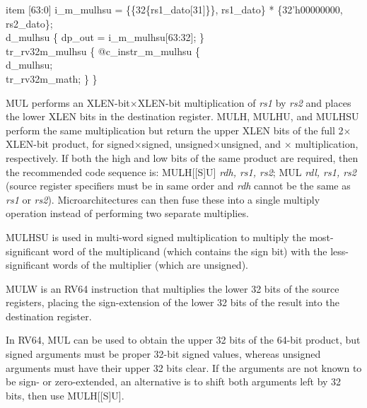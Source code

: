 {%
\indent item [63:0] i\_m\_mulhsu = \{\{32\{rs1\_dato[31]\}\}, rs1\_dato\} * \{32'h00000000, rs2\_dato\};\\%
\indent d\_mulhsu \{ dp\_out = i\_m\_mulhsu[63:32]; \}\\%
\indent tr\_rv32m\_mulhsu \{ @c\_instr\_m\_mulhsu \{ \\%
\indent \hspace{\parindent} d\_mulhsu; \\%
\indent \hspace{\parindent} tr\_rv32m\_math; \} \} \\%
}

MUL performs an XLEN-bit$\times$XLEN-bit multiplication
of {\em rs1} by {\em rs2} and places the
lower XLEN bits in the destination register.  MULH, MULHU, and MULHSU
perform the same multiplication but return the upper XLEN bits of the
full 2$\times$XLEN-bit product, for signed$\times$signed,
unsigned$\times$unsigned, and $\times$ multiplication,
respectively.  If both the high and low bits of the same product are
required, then the recommended code sequence is: MULH[[S]U] {\em rdh,
  rs1, rs2}; MUL {\em rdl, rs1, rs2} (source register specifiers must
be in same order and {\em rdh} cannot be the same as {\em rs1} or {\em
  rs2}).  Microarchitectures can then fuse these into a single
multiply operation instead of performing two separate multiplies.

\begin{commentary}
MULHSU is used in multi-word signed multiplication to multiply the
most-significant word of the multiplicand (which contains the sign bit)
with the less-significant words of the multiplier (which are unsigned).
\end{commentary}

MULW is an RV64 instruction that multiplies the lower 32 bits of the source
registers, placing the sign-extension of the lower 32 bits of the result
into the destination register.

\begin{commentary}
In RV64, MUL can be used to obtain the upper 32 bits of the 64-bit product,
but signed arguments must be proper 32-bit signed values, whereas unsigned
arguments must have their upper 32 bits clear.  If the
arguments are not known to be sign- or zero-extended, an alternative is to
shift both arguments left by 32 bits, then use MULH[[S]U].
\end{commentary}

